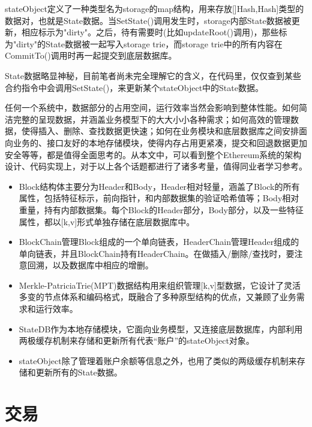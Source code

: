 \documentclass[UTF8]{ctexart}
\begin{document}
stateObject定义了一种类型名为storage的map结构，用来存放[]Hash,Hash]类型的数据对，也就是State数据。当SetState()调用发生时，storage内部State数据被更新，相应标示为"dirty"。之后，待有需要时(比如updateRoot()调用)，那些标为"dirty"的State数据被一起写入storage trie，而storage trie中的所有内容在CommitTo()调用时再一起提交到底层数据库。

State数据略显神秘，目前笔者尚未完全理解它的含义，在代码里，仅仅查到某些合约指令中会调用SetState()，来更新某个stateObject中的State数据。


任何一个系统中，数据部分的占用空间，运行效率当然会影响到整体性能。如何简洁完整的呈现数据，并涵盖业务模型下的大大小小各种需求；如何高效的管理数据，使得插入、删除、查找数据更快速；如何在业务模块和底层数据库之间安排面向业务的、接口友好的本地存储模块，使得内存占用更紧凑，提交和回退数据更加安全等等，都是值得全面思考的。从本文中，可以看到整个Ethereum系统的架构设计、代码实现上，对于以上各个话题都进行了诸多考量，值得同业者学习参考。

\begin{itemize}

\item Block结构体主要分为Header和Body，Header相对轻量，涵盖了Block的所有属性，包括特征标示，前向指针，和内部数据集的验证哈希值等；Body相对重量，持有内部数据集。每个Block的Header部分，Body部分，以及一些特征属性，都以[k,v]形式单独存储在底层数据库中。

\item BlockChain管理Block组成的一个单向链表，HeaderChain管理Header组成的单向链表，并且BlockChain持有HeaderChain。在做插入/删除/查找时，要注意回溯，以及数据库中相应的增删。

\item Merkle-PatriciaTrie(MPT)数据结构用来组织管理[k,v]型数据，它设计了灵活多变的节点体系和编码格式，既融合了多种原型结构的优点，又兼顾了业务需求和运行效率。

\item StateDB作为本地存储模块，它面向业务模型，又连接底层数据库，内部利用两极缓存机制来存储和更新所有代表“账户”的stateObject对象。

\item stateObject除了管理着账户余额等信息之外，也用了类似的两级缓存机制来存储和更新所有的State数据。

\end{itemize}

\section{交易}
\end{document}
